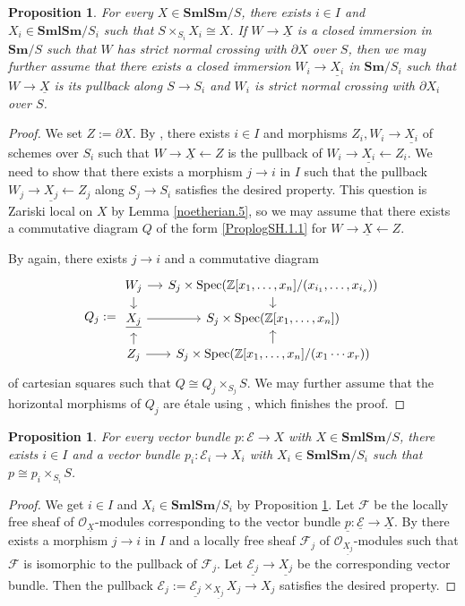 \documentclass[11pt, a4paper]{amsart}
\newtheorem{prop}[thm]{Proposition}
\theoremstyle{definition}
\numberwithin{equation}{subsection}
\newcommand{\Z}{\mathbb{Z}}
\newcommand{\Sm}{\mathbf{Sm}}
\newcommand{\SmlSm}{\mathbf{SmlSm}}
\providecommand{\Spec}[1]{\operatorname{Spec}(#1)} 	%
\renewcommand{\ul}{\underline}
\newcommand{\cE}{\mathcal{E}}
\newcommand{\cF}{\mathcal{F}}
\newcommand{\cO}{\mathcal{O}}
\begin{document}
\begin{prop}
\label{noetherian.1}
For every $X\in \SmlSm/S$,
there exists $i\in I$ and $X_i\in \SmlSm/S_i$ such that $S\times_{S_i} X_i\cong X$.
If $W\to \ul{X}$ is a closed immersion in $\Sm/S$ such that $W$ has strict normal crossing with $\partial X$ over $S$,
then we may further assume that there exists a closed immersion $W_i\to \ul{X_i}$ in $\Sm/S_i$ such that $W\to \ul{X}$ is its pullback along $S\to S_i$ and $W_i$ is strict normal crossing with $\partial X_i$ over $S$.
\end{prop}
\begin{proof}
We set $Z:=\partial X$.
By \cite[Th\'eor\`eme IV.8.8.2]{EGA},
there exists $i\in I$ and morphisms $Z_i,W_i\to \ul{X_i}$ of schemes over $S_i$ such that $W\to \ul{X}\leftarrow Z$ is the pullback of $W_i\to \ul{X_i}\leftarrow  Z_i$.
We need to show that there exists a morphism $j\to i$ in $I$ such that the pullback $W_j\to \ul{X_j}\leftarrow Z_j$ along $S_j\to S_i$ satisfies the desired property.
This question is Zariski local on $X$ by Lemma \ref{noetherian.5},
so we may assume that there exists a commutative diagram $Q$ of the form \eqref{ProplogSH.1.1} for $W\to \ul{X}\leftarrow Z$.

By \cite[Th\'eor\`eme IV.8.8.2]{EGA} again,
there exists $j\to i$ and a commutative diagram 
\[
Q_j
:=
\begin{tikzcd}[column sep=small, row sep=small]
W_j\ar[d]\ar[r]&
S_j\times \Spec{\Z[x_1,\ldots,x_n]/(x_{i_1},\ldots, x_{i_s})}\ar[d]
\\
\ul{X_j}\ar[d,leftarrow]\ar[r]&
S_j\times \Spec{\Z[x_1,\ldots,x_n]}\ar[d,leftarrow]
\\
Z_j\ar[r]&
S_j\times \Spec{\Z[x_1,\ldots,x_n]/(x_1\cdots x_r)}
\end{tikzcd}
\]
of cartesian squares such that $Q\cong Q_j\times_{S_j}S$.
We may further assume that the horizontal morphisms of $Q_j$ are \'etale using \cite[Proposition IV.17.7.8]{EGA},
which finishes the proof.
\end{proof}




\begin{prop}
\label{noetherian.2}
For every vector bundle $p\colon \cE\to X$ with $X\in \SmlSm/S$,
there exists $i\in I$ and a vector bundle $p_i\colon \cE_i\to X_i$ with $X_i\in \SmlSm/S_i$ such that $p\cong p_i\times_{S_i}S$.
\end{prop}
\begin{proof}
We get $i\in I$ and $X_i\in \SmlSm/S_i$ by Proposition \ref{noetherian.1}.
Let $\cF$ be the locally free sheaf of $\cO_{\ul{X}}$-modules corresponding to the vector bundle $\ul{p}\colon \ul{\cE}\to \ul{X}$.
By \cite[Th\'eor\`eme IV.8.5.2, Proposition IV.8.5.5]{EGA}
there exists a morphism $j\to i$ in $I$ and a locally free sheaf $\cF_j$ of $\cO_{\ul{X_j}}$-modules such that $\cF$ is isomorphic to the pullback of $\cF_j$.
Let $\ul{\cE_j}\to \ul{X_j}$ be the corresponding vector bundle.
Then the pullback $\cE_j:=\ul{\cE_j}\times_{\ul{X_j}}X_j\to X_j$ satisfies the desired property.
\end{proof}
\end{document}
